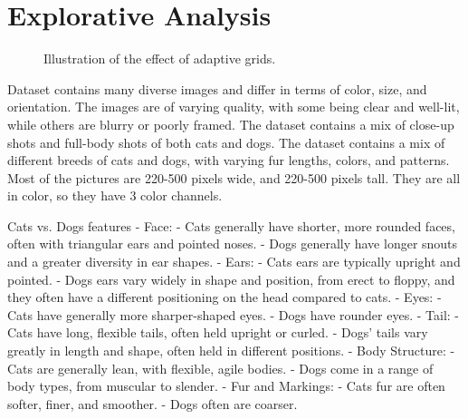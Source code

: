 \section{Explorative Analysis}
\begin{figure}[H]
    \vspace*{-0.7cm}
    \centering
    \hspace{1cm}
    \caption{Illustration of the effect of adaptive grids.}
    \label{fig:cats_dogs}
    \vspace*{-0.7cm}
\end{figure}

Dataset contains many diverse images and differ in terms of color, size, and orientation. The images are of varying quality, with some being clear and well-lit, while others are blurry or poorly framed. The dataset contains a mix of close-up shots and full-body shots of both cats and dogs. The dataset contains a mix of different breeds of cats and dogs, with varying fur lengths, colors, and patterns. Most of the pictures are 220-500 pixels wide, and 220-500 pixels tall. They are all in color, so they have 3 color channels. 

Cats vs. Dogs features
- Face:
- Cats generally have shorter, more rounded faces, often with triangular ears and pointed noses.
- Dogs generally have longer snouts and a greater diversity in ear shapes.
- Ears:
- Cats ears are typically upright and pointed.
- Dogs ears vary widely in shape and position, from erect to floppy, and they often have a different positioning on the head compared to cats.
- Eyes:
- Cats have generally more sharper-shaped eyes.
- Dogs have rounder eyes.
- Tail:
- Cats have long, flexible tails, often held upright or curled.
- Dogs’ tails vary greatly in length and shape, often held in different positions.
- Body Structure:
- Cats are generally lean, with flexible, agile bodies.
- Dogs come in a range of body types, from muscular to slender.
- Fur and Markings:
- Cats fur are often softer, finer, and smoother.
- Dogs often are coarser.